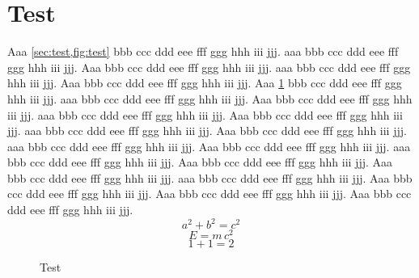 \documentclass{article}
\begin{document}
\section{Test}
\label{sec:test}

Aaa \cref{sec:test,fig:test} bbb ccc ddd eee fff ggg hhh iii jjj.
 aaa bbb ccc ddd eee fff ggg hhh iii jjj. Aaa
 bbb ccc ddd eee fff ggg hhh iii jjj.
 aaa bbb ccc ddd eee fff ggg hhh iii jjj. Aaa bbb ccc ddd
eee fff ggg hhh iii jjj. Aaa \cref*{sec:test} bbb ccc ddd eee fff ggg hhh iii
jjj.  aaa bbb ccc ddd eee fff ggg hhh iii jjj. Aaa
 bbb ccc ddd eee fff ggg hhh iii jjj.
 aaa bbb ccc ddd eee fff ggg hhh iii jjj. Aaa
 bbb ccc ddd eee fff ggg hhh iii jjj. 
aaa bbb ccc ddd eee fff ggg hhh iii jjj. Aaa 
bbb ccc ddd eee fff ggg hhh iii jjj.  aaa bbb
ccc ddd eee fff ggg hhh iii jjj. Aaa  bbb ccc ddd eee fff
ggg hhh iii jjj.  aaa bbb ccc ddd eee fff ggg hhh iii jjj.
Aaa  bbb ccc ddd eee fff ggg hhh iii jjj. Aaa
 bbb ccc ddd eee fff ggg hhh iii jjj. 
aaa bbb ccc ddd eee fff ggg hhh iii jjj. Aaa  bbb ccc ddd
eee fff ggg hhh iii jjj. Aaa  bbb ccc ddd eee fff ggg hhh
iii jjj. Aaa  bbb ccc ddd eee fff ggg hhh iii jjj.
%
    \begin{equation}
    \label{eq:a}
        a^2 + b^2 = c^2
    \end{equation}
%
    \begin{equation}
    \label{eq:b}
        E = m \, c^2
    \end{equation}
%
    \begin{equation}
    \label{eq:c}
        1 + 1 = 2
    \end{equation}

\newpage

\begin{figure}
        \centering
    \caption{Test}
        \label{fig:test}
\end{figure}
\end{document}
